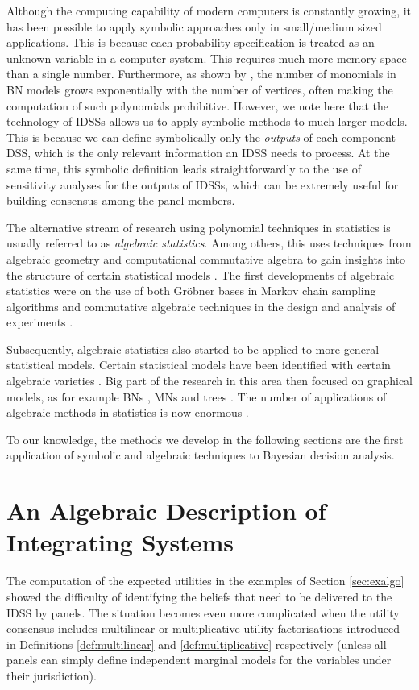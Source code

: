 Although the computing capability of modern computers is constantly growing, it has been possible to apply symbolic approaches only in small/medium sized applications. This is because each probability specification is treated as an unknown variable in a computer system. This requires much more memory space than a single number. Furthermore, as shown by \citet{Cooper1990}, the number of monomials in BN models grows exponentially with the number of vertices, often making the computation of such polynomials prohibitive. However, we note here that the technology of IDSSs allows us to apply symbolic methods to much larger models. This is because we can define symbolically only the \textit{outputs} of each component DSS, which is the only relevant information an IDSS needs to process. At the same time, this symbolic definition leads straightforwardly to the use of sensitivity analyses for the outputs of IDSSs, which can be extremely useful for building consensus among the panel members. 

The alternative stream of research using polynomial techniques in statistics is usually referred to as \textit{algebraic statistics}. Among others, this uses techniques from algebraic geometry and computational commutative algebra to gain insights into the structure of certain statistical models \citep{Riccomagno2009a}. The first developments of algebraic statistics were on  the use of both Gr\"{o}bner bases in Markov chain sampling algorithms \citep{Diaconis1998} and commutative algebraic techniques in the design and analysis of experiments \citep{Pistone1996}. 

Subsequently, algebraic statistics also started to be applied to more general statistical models. Certain statistical models have been identified with certain algebraic varieties \citep{Pistone2002}. Big part of the research in this area then focused on graphical models, as for example BNs \citep{Garcia2005, Sullivant2008}, MNs \citep{Geiger2006} and trees \citep{Settimi2000}. The number of applications of algebraic methods in statistics is now enormous \citep[see e.g. the monographs,][]{Gibilisco2010, Pistone2002, Drton2009b, Pachter2005}.

To our knowledge, the methods we develop in the following sections are the first application of symbolic and algebraic techniques to Bayesian decision analysis.  

\section{An Algebraic Description of Integrating Systems}
\label{sec:description}
The computation of the expected utilities in the examples of Section \ref{sec:exalgo} showed the difficulty of identifying the beliefs that need to be delivered  to the IDSS by panels. The situation becomes even more complicated when the utility consensus includes multilinear or multiplicative utility factorisations introduced in Definitions \ref{def:multilinear} and \ref{def:multiplicative} respectively (unless all panels can simply define independent marginal models for the variables under their jurisdiction). 

